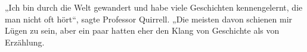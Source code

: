 „Ich bin durch die Welt gewandert und habe viele Geschichten kennengelernt, die man nicht oft hört“, sagte Professor Quirrell. „Die meisten davon schienen mir Lügen zu sein, aber ein paar hatten eher den Klang von Geschichte als von Erzählung.
